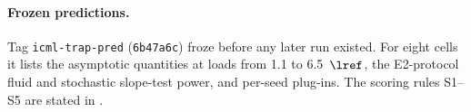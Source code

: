 \paragraph{Frozen predictions.} Tag \texttt{icml-trap-pred} (\texttt{6b47a6c}) froze
 before any later run existed. For eight cells it lists the asymptotic quantities at
loads from 1.1 to 6.5~$\lref$, the E2-protocol fluid and stochastic slope-test power, and per-seed plug-ins. The scoring
rules S1--S5 are stated in .

